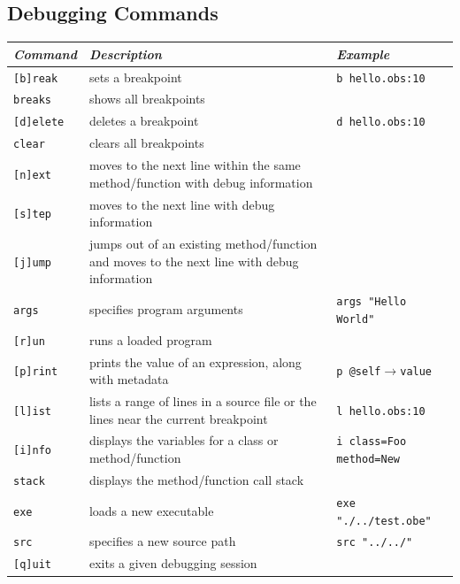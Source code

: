 \documentclass[12pt]{article}
\begin{document}
\subsection{Debugging Commands}
\begin{center}
  \begin{tabular}{| l |p{4 cm} |p{6 cm} |}
    \hline
    \emph{Command} & \emph{Description} & \emph{Example} \\ \hline \hline
    \texttt{[b]reak} &  sets a breakpoint & \texttt{b hello.obs:10} \\ \hline
    \texttt{breaks} &  shows all breakpoints &  \\ \hline
    \texttt{[d]elete} &  deletes a breakpoint & \texttt{d hello.obs:10} \\ \hline
    \texttt{clear} &  clears all breakpoints &  \\ \hline
    \texttt{[n]ext} &  moves to the next line within the same
    method/function with debug information & \\ \hline
    \texttt{[s]tep} &  moves to the next line with debug information &  \\ \hline
    \texttt{[j]ump} &  jumps out of an existing method/function and moves to the next line with debug information &  \\ \hline
    \texttt{args} &  specifies program arguments & \texttt{args "Hello World"} \\ \hline
    \texttt{[r]un} &  runs a loaded program &  \\ \hline
    \texttt{[p]rint} &  prints the value of an expression, along with metadata & \texttt{p @self$\rightarrow$value} \\ \hline
    \texttt{[l]ist} &  lists a range of lines in a source file or the lines near the current breakpoint & \texttt{l hello.obs:10} \\ \hline
    \texttt{[i]nfo} &  displays the variables for a class or method/function & \texttt{i class=Foo method=New} \\ \hline
    \texttt{stack} &  displays the method/function call stack &  \\ \hline
    \texttt{exe} &  loads a new executable & \texttt{exe "./../test.obe"} \\ \hline
    \texttt{src} &  specifies a new source path & \texttt{src "../../"} \\ \hline
    \texttt{[q]uit} &  exits a given debugging session &  \\ \hline
  \end{tabular}
\end{center}
\end{document}
